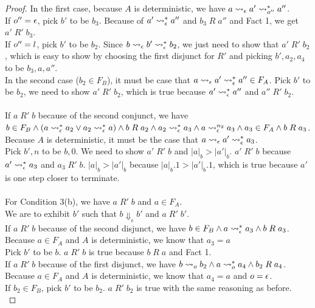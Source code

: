 \begin{proof}
  In the first case, because $A$ is deterministic, we have $a\leadsto_\epsilon a'\leadsto^*_{o''}a''$. \\
  If $o''=\epsilon$, pick $b'$ to be $b_3$. Because of $a'\leadsto^*_\epsilon a''$ and $b_3\;R\;a''$ and Fact 1, we get $a'\;R'\;b_3$. \\
  If $o''=l$, pick $b'$ to be $b_2$. Since $b\leadsto_\epsilon b'\leadsto^*_\epsilon b_2$, we just need to show that $a'\;R'\;b_2$, which is easy to show by choosing the first disjunct for $R'$ and picking $b',a_2,a_4$ to be $b_3, a, a''$. \\
  In the second case ($b_2\in F_B$), it must be case that $a\leadsto_\epsilon a'\leadsto^*_\epsilon a''\in F_A$. Pick $b'$ to be $b_2$, we need to show $a'\;R'\;b_2$, which is true because $a'\leadsto^*_\epsilon a''$ and $a''\;R'\;b_2$. \\
  \\
  If $a\;R'\;b$ because of the second conjunct, we have $b\in F_B\wedge (a\leadsto^*_\epsilon a_2\vee a_2\leadsto^*_\epsilon a)\wedge b\;R\;a_2\wedge a_2\leadsto^*_\epsilon a_3\wedge a\leadsto^{n_2}_\epsilon a_3\wedge a_3\in F_A\wedge b\;R\;a_3$. \\
  Because $A$ is deterministic, it must be the case that $a\leadsto_\epsilon a'\leadsto^*_\epsilon a_3$. \\
  Pick $b',n$ to be $b,0$. We need to show $a'\;R'\;b$ and $|a|_b>|a'|_b$. $a'\;R'\;b$ because $a'\leadsto^*_\epsilon a_3$ and $a_3\;R'\;b$. $|a|_b>|a'|_b$ because $|a|_b.1>|a'|_b.1$, which is true because $a'$ is one step closer to terminate. \\
  \\
  For Condition 3(b), we have $a\;R'\;b$ and $a\in F_A$. \\
  We are to exhibit $b'$ such that $b\Downarrow_\epsilon b'$ and $a\;R'\;b'$. \\
  If $a\;R'\;b$ because of the second disjunct, we have $b\in F_B\wedge a\leadsto^*_\epsilon a_3\wedge b\;R\;a_3$. Because $a\in F_A$ and $A$ is deterministic, we know that $a_3=a$\\
  Pick $b'$ to be $b$. $a\;R'\;b$ is true because $b\;R\;a$ and Fact 1. \\
  If $a\;R'\;b$ because of the first disjunct, we have $b\leadsto_o b_2\wedge a\leadsto^*_o a_4\wedge b_2\;R\;a_4$. \\
  Because $a\in F_A$ and $A$ is deterministic, we know that $a_4=a$ and $o=\epsilon$. \\
  If $b_2\in F_B$, pick $b'$ to be $b_2$. $a\;R'\;b_2$ is true with the same reasoning as before. \\

\end{proof}
